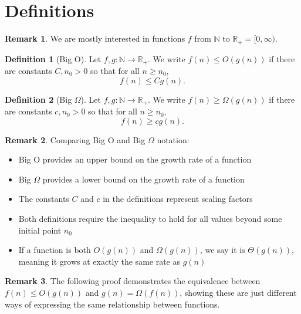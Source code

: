 \documentclass{article}
\theoremstyle{definition}
\newtheorem{definition}{Definition}
\newtheorem{remark}{Remark}
\begin{document}
\section{Definitions}


\begin{remark}
We are mostly interested in functions $f$ from $\mathbb{N}$ to $\mathbb{R}_+ = [0,\infty)$.
\end{remark}

\begin{definition}[Big O]
Let $f,g : \mathbb{N} \to \mathbb{R}_+$. We write $f(n) \leq O(g(n))$ if there are constants $C,n_0 > 0$ so that for all $n \geq n_0$,
\[ f(n) \leq Cg(n). \]
\end{definition}

\begin{definition}[Big $\Omega$]
Let $f,g : \mathbb{N} \to \mathbb{R}_+$. We write $f(n) \geq \Omega(g(n))$ if there are constants $c,n_0 > 0$ so that for all $n \geq n_0$,
\[ f(n) \geq cg(n). \]
\end{definition}

\begin{remark}
Comparing Big O and Big $\Omega$ notation:
\begin{itemize}
    \item Big O provides an upper bound on the growth rate of a function
    \item Big $\Omega$ provides a lower bound on the growth rate of a function
    \item The constants $C$ and $c$ in the definitions represent scaling factors
    \item Both definitions require the inequality to hold for all values beyond some initial point $n_0$
    \item If a function is both $O(g(n))$ and $\Omega(g(n))$, we say it is $\Theta(g(n))$, meaning it grows at exactly the same rate as $g(n)$
\end{itemize}
\end{remark}

\begin{remark}
The following proof demonstrates the equivalence between $f(n) \leq O(g(n))$ and $g(n) = \Omega(f(n))$, showing these are just different ways of expressing the same relationship between functions.
\end{remark}
\end{document}

